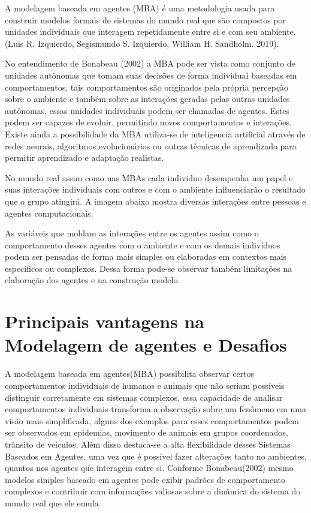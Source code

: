 A modelagem baseada em agentes (MBA) é uma metodologia usada para construir modelos formais de sistemas do mundo real que são compostos por unidades individuais que interagem repetidamente entre si e com seu ambiente.(Luis R. Izquierdo, Segismundo S. Izquierdo, William H. Sandholm. 2019)\cite{izquierdo2019introduction}. 

No entendimento de Bonabeau (2002) a MBA pode ser vista como conjunto de unidades autônomas que tomam suas decisões de forma individual baseadas em comportamentos, tais comportamentos são originados pela própria percepção sobre o ambiente e também sobre as interações geradas pelas outras unidades autônomas, essas unidades individuais podem ser chamadas de agentes. Estes podem ser capazes de evoluir, permitindo novos comportamentos e interações. Existe ainda a possibilidade da MBA utiliza-se de inteligencia artificial através de redes neurais, algoritmos evolucionários ou outras técnicas de aprendizado para permitir aprendizado e adaptação realistas\cite{bonabeau2002agent}. 

No mundo real assim como nas MBAs cada individuo desempenha um papel e suas interações individuais com outros e com o ambiente influenciarão o resultado que o grupo atingirá. A imagem abaixo mostra diversas interações entre pessoas e agentes computacionais.  




As variáveis que moldam as interações entre os agentes assim como o comportamento desses agentes com o ambiente e com os demais indivíduos podem ser pensadas de forma mais simples ou elaboradas em contextos mais específicos ou complexos. Dessa forma pode-se observar também limitações na elaboração dos agentes e na construção modelo.

\section{Principais vantagens na Modelagem de agentes e Desafios}

A modelagem baseada em agentes(MBA) possibilita observar certos comportamentos individuais de humanos e animais que não seriam possíveis distinguir corretamente em sistemas complexos, essa capacidade de analisar comportamentos individuais transforma a observação sobre um fenômeno em uma visão mais simplificada, alguns dos exemplos para esses comportamentos podem ser observados em epidemias, movimento de animais em grupos coordenados, trânsito de veículos. Além disso destaca-se a alta flexibilidade desses Sistemas Baseados em Agentes, uma vez que é possível fazer alterações tanto no ambientes, quantos nos agentes que interagem entre si. Conforme Bonabeau(2002) mesmo modelos simples baseado em agentes pode exibir padrões de comportamento complexos e contribuir com informações valiosas sobre a dinâmica do sistema do mundo real que ele emula \cite{bonabeau2002agent}

